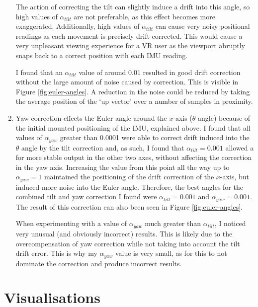 \documentclass[11pt]{article}
\begin{document}
\begin{enumerate}
The action of correcting the tilt can slightly induce a drift into this angle, so high values of $\alpha_{tilt}$ are not preferable, as this effect becomes more exaggerated.
Additionally, high values of $\alpha_{tilt}$ can cause very noisy positional readings as each movement is precisely drift corrected.
This would cause a very unpleasant viewing experience for a VR user as the viewport abruptly snaps back to a correct position with each IMU reading.

I found that an $\alpha_{tilt}$ value of around 0.01 resulted in good drift correction without the large amount of noise caused by correction. This is visible in Figure \ref{fig:euler-angles}.
A reduction in the noise could be reduced by taking the average position of the `up vector' over a number of samples in proximity.


\item 
Yaw correction effects the Euler angle around the $x$-axis ($\theta$ angle) because of the initial mounted positioning of the IMU, explained above.
I found that all values of $\alpha_{yaw}$ greater than 0.0001 were able to correct drift induced into the $\theta$ angle by the tilt correction and, as such, I found that $\alpha_{tilt}=0.001$ allowed a for more stable output in the other two axes, without affecting the correction in the yaw axis.
Increasing the value from this point all the way up to $\alpha_{yaw}=1$ maintained the positioning of the drift correction of the $x$-axis, but induced more noise into the Euler angle. 
Therefore, the best angles for the combined tilt and yaw correction I found were $\alpha_{tilt}=0.001$ and $\alpha_{yaw}=0.001$.
The result of this correction can also been seen in Figure \ref{fig:euler-angles}.

When experimenting with a value of $\alpha_{yaw}$ much greater than $\alpha_{tilt}$, I noticed very unusual (and obviously incorrect) results. This is likely due to the overcompensation of yaw correction while not taking into account the tilt drift error. This is why my $\alpha_{yaw}$ value is very small, as for this to not dominate the correction and produce incorrect results.


\end{enumerate}

\section*{Visualisations}
\end{document}
